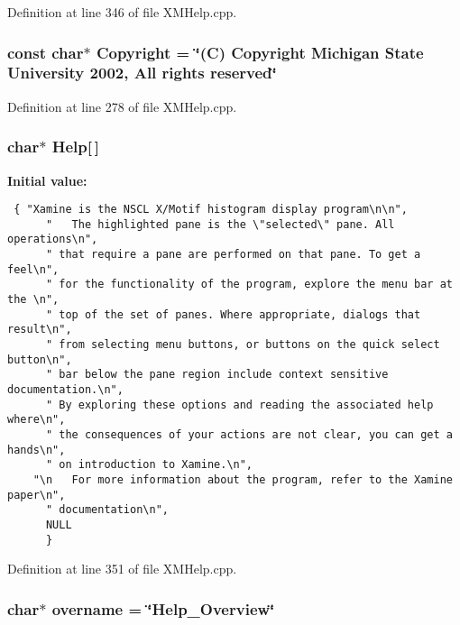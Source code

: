 Definition at line 346 of file XMHelp.cpp.
\subsubsection{\setlength{\rightskip}{0pt plus 5cm}const char$\ast$ Copyright = \char`\"{}(C) Copyright Michigan State University 2002, All rights reserved\char`\"{}\hspace{0.3cm}{\tt  [static]}}\label{XMHelp_8cpp_a0}




Definition at line 278 of file XMHelp.cpp.
\subsubsection{\setlength{\rightskip}{0pt plus 5cm}char$\ast$ Help[$\,$]\hspace{0.3cm}{\tt  [static]}}\label{XMHelp_8cpp_a5}


{\bf Initial value:}

\footnotesize\begin{verbatim} { "Xamine is the NSCL X/Motif histogram display program\n\n",
      "   The highlighted pane is the \"selected\" pane. All operations\n",
      " that require a pane are performed on that pane. To get a feel\n",
      " for the functionality of the program, explore the menu bar at the \n",
      " top of the set of panes. Where appropriate, dialogs that result\n",
      " from selecting menu buttons, or buttons on the quick select button\n",
      " bar below the pane region include context sensitive documentation.\n",
      " By exploring these options and reading the associated help where\n",
      " the consequences of your actions are not clear, you can get a hands\n",
      " on introduction to Xamine.\n",
    "\n   For more information about the program, refer to the Xamine paper\n",
      " documentation\n",
      NULL
      }\end{verbatim}\normalsize 


Definition at line 351 of file XMHelp.cpp.
\subsubsection{\setlength{\rightskip}{0pt plus 5cm}char$\ast$ overname = \char`\"{}Help\_\-Overview\char`\"{}\hspace{0.3cm}{\tt  [static]}}\label{XMHelp_8cpp_a6}




